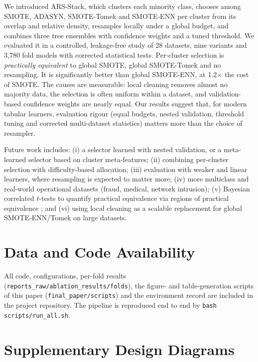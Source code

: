 \documentclass[11pt,a4paper]{article}
\begin{document}
We introduced ARS-Stack, which clusters each minority class, chooses among SMOTE, ADASYN, SMOTE-Tomek and SMOTE-ENN per cluster from its overlap and relative density, resamples locally under a global budget, and combines three tree ensembles with confidence weights and a tuned threshold. We evaluated it in a controlled, leakage-free study of 28 datasets, nine variants and 3{,}780 fold models with corrected statistical tests. Per-cluster selection is \emph{practically equivalent} to global SMOTE, global SMOTE-Tomek and no resampling. It is significantly better than global SMOTE-ENN, at 1.2$\times$ the cost of SMOTE. The causes are measurable: local cleaning removes almost no majority data, the selection is often uniform within a dataset, and validation-based confidence weights are nearly equal. Our results suggest that, for modern tabular learners, evaluation rigour (equal budgets, nested validation, threshold tuning and corrected multi-dataset statistics) matters more than the choice of resampler.

Future work includes: (i) a selector learned with nested validation, or a meta-learned selector based on cluster meta-features; (ii) combining per-cluster selection with difficulty-based allocation; (iii) evaluation with weaker and linear learners, where resampling is expected to matter more; (iv) more multiclass and real-world operational datasets (fraud, medical, network intrusion); (v) Bayesian correlated $t$-tests to quantify practical equivalence via regions of practical equivalence \cite{benavoli2016posthoc}; and (vi) using local cleaning as a scalable replacement for global SMOTE-ENN/Tomek on large datasets.

\section*{Data and Code Availability}
All code, configurations, per-fold results (\texttt{reports\_raw/ablation\_results/folds}), the figure- and table-generation scripts of this paper (\texttt{final\_paper/scripts}) and the environment record are included in the project repository. The pipeline is reproduced end to end by \texttt{bash scripts/run\_all.sh}.




\appendix
\section{Supplementary Design Diagrams}
\end{document}
